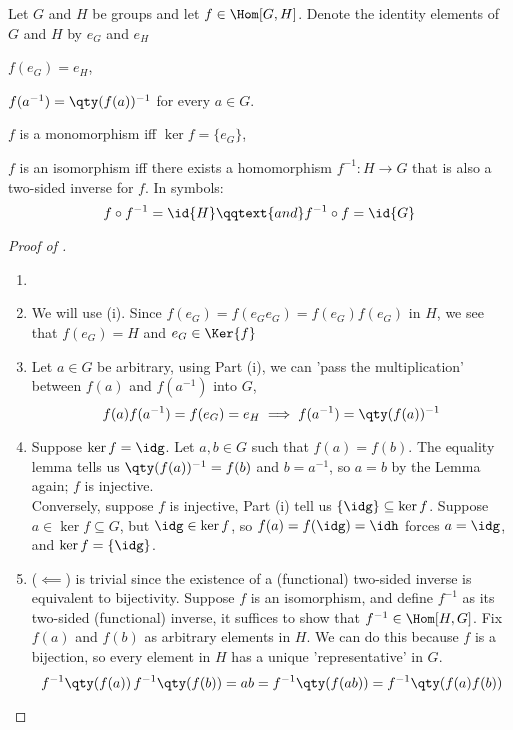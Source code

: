 \documentclass[../main-v2-manifolds.tex]{subfiles}
\begin{document}
\begin{wts}\label{hungerford-chp1:theorem2.3}
    Let $G$ and $H$ be groups and let $f\in \Hom[G,H]$. Denote the identity elements of $G$ and $H$ by $e_G$ and $e_H$
    \begin{enumroman}
        \item $f(e_G)=e_H$,
        \item $f(a^{-1})=\qty(f(a))^{-1}$ for every $a\in G$.
        \item $f$ is a monomorphism iff $\ker f = \{e_G\}$,
        \item $f$ is an isomorphism iff there exists a homomorphism $f^{-1}: H\to G$ that is also a two-sided inverse for $f$. In symbols:
        \begin{equation}\label{hungerford-chp1:theorem2.3-isomorphism-equation}
            f\circ f^{-1}=\id{H}\qqtext{and}f^{-1}\circ f=\id{G}
        \end{equation}
    \end{enumroman}
\end{wts}
\begin{proof}[Proof of ]
    \begin{enumerate}[label={Proof of Part (\roman*): },leftmargin=*]
        \item[]
        \item We will use  (i). Since $f(e_G)=f(e_Ge_G)=f(e_G)f(e_G)$ in $H$, we see that $f(e_G)=H$ and $e_G\in \Ker{f}$
        \item Let $a\in G$ be arbitrary, using Part (i), we can 'pass the multiplication' between $f(a)$ and $f(a^{-1})$ into $G$, 
        \[
            f(a)f(a^{-1})=f(e_G)=e_H\implies f(a^{-1})=\qty(f(a))^{-1}
        \]
        \item Suppose $\ker{f}={\idg}$. Let $a,b\in G$ such that $f(a)=f(b)$. The equality lemma  tells us $\qty(f(a))^{-1}=f(b)$ and $b=a^{-1}$, so $a=b$ by the Lemma again; $f$ is injective.\\

        Conversely, suppose $f$ is injective, Part (i) tell us $\{\idg\}\subseteq \ker{f}$. Suppose $a\in \ker{f}\subseteq G$, but $\idg\in\ker{f}$, so $f(a)=f(\idg)=\idh$ forces $a=\idg$, and $\ker{f}=\{\idg\}$.
        \item ($\impliedby$) is trivial since the existence of a (functional) two-sided inverse is equivalent to bijectivity. Suppose $f$ is an isomorphism, and define $f^{-1}$ as its two-sided (functional) inverse, it suffices to show that $f^{-1}\in\Hom[H,G]$. Fix $f(a)$ and $f(b)$ as arbitrary elements in $H$. We can do this because $f$ is a bijection, so every element in $H$ has a unique 'representative' in $G$. 
        \[
            f^{-1}\qty(f(a))\,f^{-1}\qty(f(b))=ab=f^{-1}\qty(f(ab))=f^{-1}\qty(f(a)f(b))
        \]
    \end{enumerate}
\end{proof}
\end{document}
